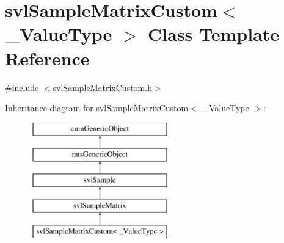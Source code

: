 \hypertarget{classsvl_sample_matrix_custom}{}\section{svl\+Sample\+Matrix\+Custom$<$ \+\_\+\+Value\+Type $>$ Class Template Reference}
\label{classsvl_sample_matrix_custom}


{\ttfamily \#include $<$svl\+Sample\+Matrix\+Custom.\+h$>$}

Inheritance diagram for svl\+Sample\+Matrix\+Custom$<$ \+\_\+\+Value\+Type $>$\+:\begin{figure}[H]
\begin{center}
\leavevmode
\includegraphics[height=5.000000cm]{d7/d0e/classsvl_sample_matrix_custom}
\end{center}
\end{figure}
